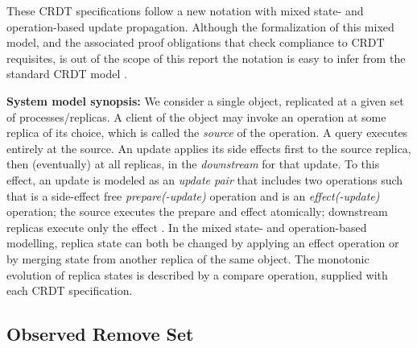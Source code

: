 \documentclass[a4paper]{article}
\begin{document}
These CRDT specifications follow a new notation with mixed state- and
operation-based update propagation. Although the formalization of this mixed
model, and the associated proof obligations that check compliance to CRDT
requisites, is out of the scope of this report the notation is easy to infer
from the standard CRDT model 
\cite{syn:rep:sh143,rep:syn:sh138,syn:sh144}. 




{\bf System model synopsis:} We consider a single object, replicated at a
given set of processes/replicas. A client of the object may invoke an
operation at some replica of its choice, which is called the \emph{source}
of the operation.  A query executes entirely at the source.  An update
applies its side effects first to the source replica, then (eventually) at
all replicas, in the \emph{downstream} for that update. To this effect, an
update is modeled as an \emph{update pair}  that includes two
operations such that  is a side-effect free \emph{prepare(-update)}
operation and  is an \emph{effect(-update)} operation; the source
executes the prepare and effect atomically; downstream replicas execute only
the effect . In the mixed state- and operation-based modelling, replica
state can both be changed by applying an effect operation or by merging
state from another replica of the same object. The monotonic evolution of
replica states is described by a compare operation, supplied with each CRDT
specification.  


\subsection{Observed Remove Set}


\end{document}
